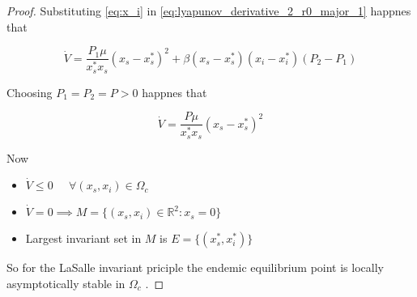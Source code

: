 \begin{proof}
Substituting \ref{eq:x_i} in \ref{eq:lyapunov_derivative_2_r0_major_1} happnes that

\begin{equation}
    \label{eq:lyapunov_derivative_3_r0_major_1}
    \dot{V} = \frac{P_1 \mu}{x_s^* x_s} \left( x_s - x_s^* \right)^2 + \beta \left( x_s - x_s^* \right)\left( x_i - x_i^* \right)\left( P_2 - P_1 \right)
\end{equation}

Choosing $P_1 = P_2 = P > 0$ happnes that

\begin{equation}
    \label{eq:lyapunov_derivative_4_r0_major_1}
    \dot{V} = \frac{P\mu}{x_s^* x_s} \left( x_s - x_s^* \right)^2
\end{equation}

Now
\begin{itemize}
    \item $ \dot{V} \leq 0 \;\;\;\;\; \forall \left( x_s, x_i \right) \in \Omega_c$
    \item $ \dot{V} = 0 \implies M = \{(x_s,x_i) \in\mathbb{R}^2: x_s = 0\}$
    \item Largest invariant set in $M$ is $E = \{(x_s^*,x_i^*)\}$
\end{itemize}

So for the LaSalle invariant priciple the endemic equilibrium point is locally asymptotically stable in $\Omega_c$ \cite[p.128]{bib:khalil}.
\end{proof}